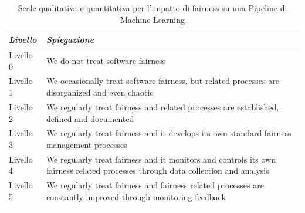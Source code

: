      \begin{longtable}{| p{} | p{} |} 
      
      \hline\textbf{\textit{Livello}} & \textbf{\textit{Spiegazione}}
       
        
        \\ \hline
        \rowcolor{Gray}
        Livello 0    
        
        &  We do not treat software fairness

        \\ \hline


       Livello 1    
        
        & We occasionally treat software fairness,  but related processes are disorganized and even chaotic



        \\ \hline
        \rowcolor{Gray}
        Livello 2   
        
        &  We regularly treat fairness and related processes are established, defined and documented


        \\ \hline


        Livello 3   
        
        & We regularly treat fairness and it develops its own standard fairness management processes



        \\ \hline
        
        \rowcolor{Gray}
        Livello 4
        
        &  We regularly treat fairness and it monitors and controls its own fairness related processes through data collection and analysis


        \\ \hline


        Livello 5  
        
        & We regularly treat fairness and fairness related processes are constantly improved through monitoring feedback


        \\ \hline
        \caption{Scale qualitativa e quantitativa per l'impatto di fairness su una Pipeline di Machine Learning} %
        \label{tab:myfirstlongtable}
    \end{longtable}
    
    \newpage
